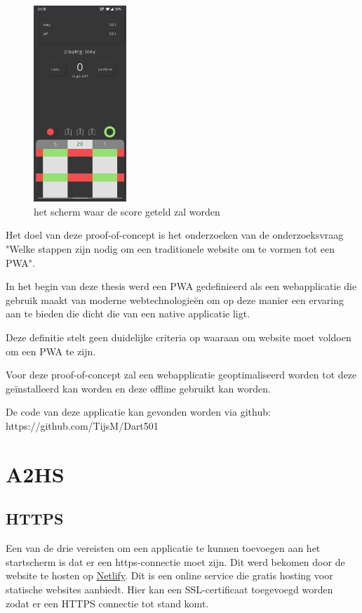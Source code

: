 	\begin{figure}[H]
		\centering
		\includegraphics[width=35mm]{./img/dart4.jpg}{}
		\caption{het scherm waar de score geteld zal worden}
	\end{figure}
	
	Het doel van deze proof-of-concept is het onderzoeken van de onderzoeksvraag "Welke stappen zijn nodig om een traditionele website om te vormen tot een PWA". 
	
	In het begin van deze thesis werd een PWA gedefinieerd als een webapplicatie die gebruik maakt van moderne webtechnologieën om op deze manier een ervaring aan te bieden die dicht die van een native applicatie ligt.
	
	Deze definitie stelt geen duidelijke criteria op waaraan om website moet voldoen om een PWA te zijn.
	
	Voor deze proof-of-concept zal een webapplicatie geoptimaliseerd worden tot deze geïnstalleerd kan worden en deze offline gebruikt kan worden.
	
	De code van deze applicatie kan gevonden worden via github: https://github.com/TijsM/Dart501
	


\section{A2HS}

	\subsection{HTTPS}

		Een van de drie vereisten om een applicatie te kunnen toevoegen aan het startscherm is dat er een https-connectie moet zijn. Dit werd bekomen door de website te hosten op \href{https://www.netlify.com/}{ Netlify}. Dit is een online service die gratis hosting voor statische websites aanbiedt. Hier kan een SSL-certificaat toegevoegd worden zodat er een HTTPS connectie tot stand komt.



